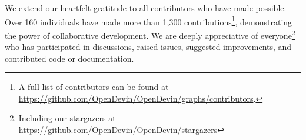 \begin{ack}
We extend our heartfelt gratitude to all contributors who have made \projname possible. Over 160 individuals have made more than 1,300 contributions\footnote{A full list of contributors can be found at \url{https://github.com/OpenDevin/OpenDevin/graphs/contributors}.}, demonstrating the power of collaborative development.
We are deeply appreciative of everyone\footnote{Including our stargazers at \url{https://github.com/OpenDevin/OpenDevin/stargazers}} who has participated in discussions, raised issues, suggested improvements, and contributed code or documentation. 





\end{ack}
